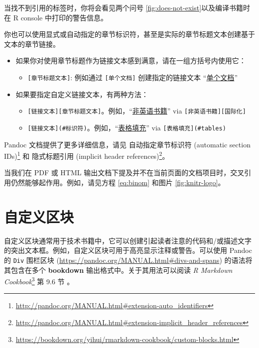\documentclass[
  12pt,
]{krantz}
\providecommand{\tightlist}{%
  \setlength{\itemsep}{0pt}\setlength{\parskip}{0pt}}
\renewcommand{\href}[2]{#2\footnote{\url{#1}}}
\theoremstyle{definition}
\theoremstyle{definition}
\theoremstyle{definition}
\theoremstyle{definition}
\theoremstyle{remark}
\begin{document}
当找不到引用的标签时，你将会看见两个问号 \ref{fig:does-not-exist}以及编译书籍时在 R console 中打印的警告信息。

你也可以使用显式或自动指定的章节标识符，甚至是实际的章节标题文本创建基于文本的章节链接。

\begin{itemize}
\tightlist
\item
  如果你对使用章节标题作为链接文本感到满意，请在一组方括号内使用它：

  \begin{itemize}
  \tightlist
  \item
    \texttt{{[}章节标题文本{]}}: 例如通过 \texttt{{[}单个文档{]}} 创建指定的链接文本 ``\hyperref[a-single-document]{单个文档}''
  \end{itemize}
\item
  如果要指定自定义链接文本，有两种方法：

  \begin{itemize}
  \tightlist
  \item
    \texttt{{[}链接文本{]}{[}章节标题文本{]}}。例如，``\hyperref[internationalization]{非英语书籍}'' via \texttt{{[}非英语书籍{]}{[}国际化{]}}
  \item
    \texttt{{[}链接文本{]}(\#标识符)}。例如，``\hyperref[tables]{表格填充}'' via \texttt{{[}表格填充{]}(\#tables)}
  \end{itemize}
\end{itemize}

Pandoc 文档提供了更多详细信息，请见 \href{http://pandoc.org/MANUAL.html\#extension-auto_identifiers}{自动指定章节标识符 (automatic section IDs)} 和 \href{http://pandoc.org/MANUAL.html\#extension-implicit_header_references}{隐式标题引用 (implicit header references)}。

当我们在 PDF 或 HTML 输出文档下提及并不在当前页面的文档项目时，交叉引用仍然能够起作用。例如，请见方程 \eqref{eq:binom} 和图片 \ref{fig:knitr-logo}。

\section{自定义区块}\label{ux81eaux5b9aux4e49ux533aux5757}

自定义区块通常用于技术书籍中，它可以创建引起读者注意的代码和/或描述文字的突出文本框。例如，自定义区块可用于高亮显示注释或警告。可以使用 Pandoc 的 \texttt{Div} 围栏区块 (\url{https://pandoc.org/MANUAL.html\#divs-and-spans}) 的语法将其包含在多个 \textbf{bookdown} 输出格式中。关于其用法可以阅读 \href{https://bookdown.org/yihui/rmarkdown-cookbook/custom-blocks.html}{\emph{R Markdown Cookbook}} 第 9.6 节 \citep{rmarkdown2020}。
\end{document}
